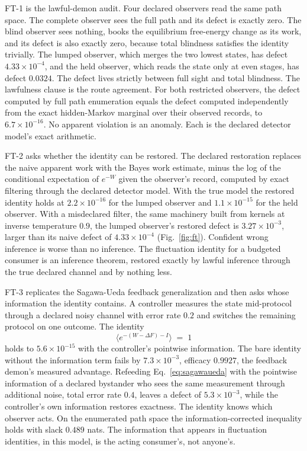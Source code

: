 \documentclass[aps,pre,reprint,nofootinbib,floatfix]{revtex4-2}
\begin{document}
FT-1 is the lawful-demon audit.  Four declared observers read the
same path space.  The complete observer sees the full path and its
defect is exactly zero.  The blind observer sees nothing, books the
equilibrium free-energy change as its work, and its defect is also
exactly zero, because total blindness satisfies the identity
trivially.  The lumped observer, which merges the two lowest
states, has defect $4.33\times10^{-4}$, and the held observer,
which reads the state only at even stages, has defect $0.0324$.
The defect lives strictly between full sight and total blindness.
The lawfulness clause is the route agreement.  For both restricted
observers, the defect computed by full path enumeration equals the
defect computed independently from the exact hidden-Markov marginal
over their observed records, to $6.7\times10^{-16}$.  No apparent
violation is an anomaly.  Each is the declared detector model's
exact arithmetic.

FT-2 asks whether the identity can be restored.  The declared
restoration replaces the naive apparent work with the Bayes work
estimate, minus the log of the conditional expectation of $e^{-W}$
given the observer's record, computed by exact filtering through
the declared detector model.  With the true model the restored
identity holds at $2.2\times10^{-16}$ for the lumped observer and
$1.1\times10^{-15}$ for the held observer.  With a misdeclared
filter, the same machinery built from kernels at inverse
temperature $0.9$, the lumped observer's restored defect is
$3.27\times10^{-3}$, larger than its naive defect of
$4.33\times10^{-4}$ (Fig.~\ref{fig:ft}).  Confident wrong
inference is worse than no inference.  The fluctuation identity for
a budgeted consumer is an inference theorem, restored exactly by
lawful inference through the true declared channel and by nothing
less.

FT-3 replicates the Sagawa-Ueda feedback generalization
\cite{SagawaUeda2010} and then asks whose information the identity
contains.  A controller measures the state mid-protocol through a
declared noisy channel with error rate $0.2$ and switches the
remaining protocol on one outcome.  The identity
\begin{equation}
  \bigl\langle e^{-(W - \Delta F) - I} \bigr\rangle \;=\; 1
  \label{eq:sagawaueda}
\end{equation}
holds to $5.6\times10^{-15}$ with the controller's pointwise
information.  The bare identity without the information term fails
by $7.3\times10^{-3}$, efficacy $0.9927$, the feedback demon's
measured advantage.  Refeeding
Eq.~\eqref{eq:sagawaueda} with the pointwise information of a
declared bystander who sees the same measurement through additional
noise, total error rate $0.4$, leaves a defect of
$5.3\times10^{-3}$, while the controller's own information restores
exactness.  The identity knows which observer acts.  On the
enumerated path space the information-corrected inequality holds
with slack $0.489$ nats.
The information that appears in fluctuation identities, in this
model, is the acting consumer's, not anyone's.
\end{document}
